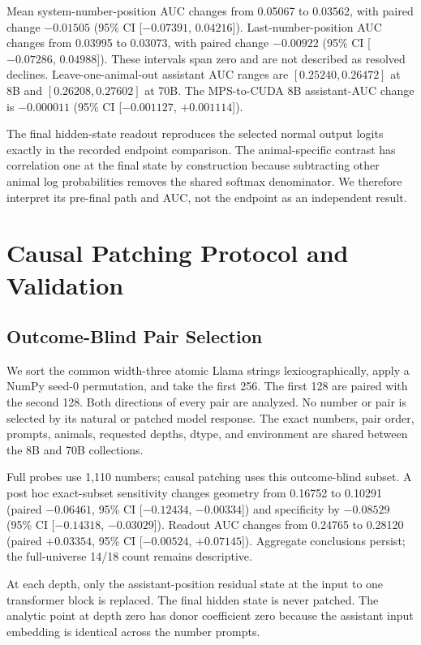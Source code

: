 \documentclass[letterpaper]{article}
\newcommand{\CI}[2]{95\% CI [#1, #2]}
\begin{document}
Mean system-number-position AUC changes from 0.05067 to 0.03562, with paired
change $-0.01505$ (\CI{$-0.07391$}{$0.04216$}). Last-number-position AUC changes
from 0.03995 to 0.03073, with paired change $-0.00922$
(\CI{$-0.07286$}{$0.04988$}). These intervals span zero and are not described as
resolved declines. Leave-one-animal-out assistant AUC ranges are
$[0.25240,0.26472]$ at 8B and $[0.26208,0.27602]$ at 70B. The MPS-to-CUDA 8B
assistant-AUC change is $-0.000011$ (\CI{$-0.001127$}{$+0.001114$}).

The final hidden-state readout reproduces the selected normal output logits
exactly in the recorded endpoint comparison. The animal-specific contrast has
correlation one at the final state by construction because subtracting other
animal log probabilities removes the shared softmax denominator. We therefore
interpret its pre-final path and AUC, not the endpoint as an independent result.

\section{Causal Patching Protocol and Validation}

\subsection{Outcome-Blind Pair Selection}

We sort the common width-three atomic Llama strings lexicographically, apply a
NumPy seed-0 permutation, and take the first 256. The first 128 are paired with
the second 128. Both directions of every pair are analyzed. No number or pair is
selected by its natural or patched model response. The exact numbers, pair
order, prompts, animals, requested depths, dtype, and environment are shared
between the 8B and 70B collections.

Full probes use 1,110 numbers; causal patching uses this outcome-blind subset.
A post hoc exact-subset sensitivity changes geometry from 0.16752 to 0.10291
(paired $-0.06461$, \CI{$-0.12434$}{$-0.00334$}) and specificity by $-0.08529$
(\CI{$-0.14318$}{$-0.03029$}). Readout AUC changes from 0.24765 to 0.28120
(paired $+0.03354$, \CI{$-0.00524$}{$+0.07145$}). Aggregate conclusions persist;
the full-universe 14/18 count remains descriptive.

At each depth, only the assistant-position residual state at the input to one
transformer block is replaced. The final hidden state is never patched. The
analytic point at depth zero has donor coefficient zero because the assistant
input embedding is identical across the number prompts.
\end{document}
